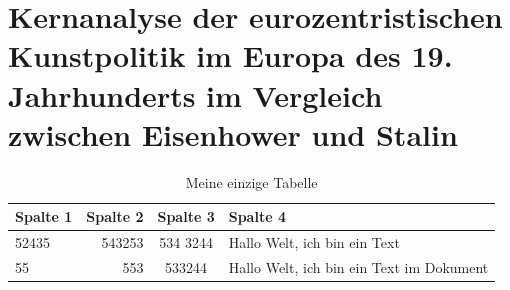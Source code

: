 \documentclass[12pt,ngerman,parkskip=half]{scrreprt}
\begin{document}
\chapter[Kernanalyse der eurozentristischen Kunstpolitik]{Kernanalyse der eurozentristischen Kunstpolitik im Europa des 19. Jahrhunderts im Vergleich zwischen Eisenhower und Stalin}

\begin{table}
\begin{center}
\caption{Meine einzige Tabelle}\label{tab:tabelle}
\begin{tabular}{lrcp{6cm}} \toprule 
Spalte 1 & Spalte 2 & Spalte 3 & Spalte 4 \\ \midrule
52435 & 543253 & 534 3244 & Hallo Welt, ich bin ein Text \\
55 & 553 & 533244 & Hallo Welt, ich bin ein Text im Dokument\\ \bottomrule
\end{tabular}
\end{center}
\end{table}
\end{document}
